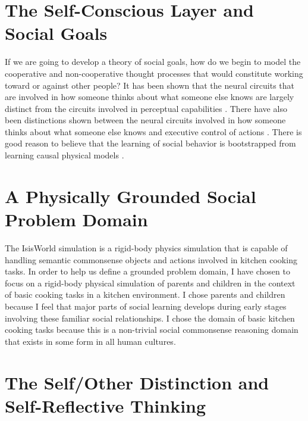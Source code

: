 \section{The Self-Conscious Layer and Social Goals}

If we are going to develop a theory of social goals, how do we begin
to model the cooperative and non-cooperative thought processes that
would constitute working toward or against other people? It has been
shown that the neural circuits that are involved in how someone thinks
about what someone else knows are largely distinct from the circuits
involved in perceptual capabilities \cite[]{bedny:2009}. There have
also been distinctions shown between the neural circuits involved in
how someone thinks about what someone else knows and executive control
of actions \cite[]{saxe:2006}. There is good reason to believe that
the learning of social behavior is bootstrapped from learning causal
physical models \cite[]{perner:1991}.

\section{A Physically Grounded Social Problem Domain}

The IsisWorld simulation \cite[]{smith:2010} is a rigid-body physics
simulation that is capable of handling semantic commonsense objects
and actions involved in kitchen cooking tasks.  In order to help us
define a grounded problem domain, I have chosen to focus on a
rigid-body physical simulation of parents and children in the context
of basic cooking tasks in a kitchen environment. I chose parents and
children because I feel that major parts of social learning develops
during early stages involving these familiar social relationships. I
chose the domain of basic kitchen cooking tasks because this is a
non-trivial social commonsense reasoning domain that exists in some
form in all human cultures.

\section{The Self/Other Distinction and Self-Reflective Thinking}

